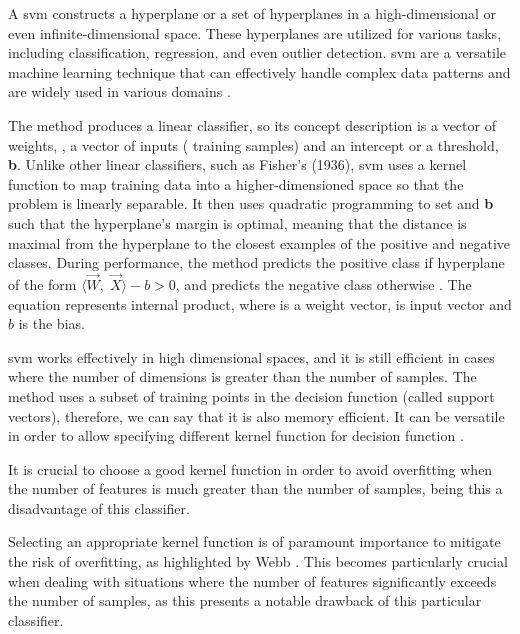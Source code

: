 A \gls{svm} constructs a hyperplane or a set of hyperplanes in a high-dimensional or even infinite-dimensional space. These hyperplanes are utilized for various tasks, including classification, regression, and even outlier detection. \gls{svm} are a versatile machine learning technique that can effectively handle complex data patterns and are widely used in various domains \cite{scikit_learn2023}.

The method produces a linear classifier, so its concept description is a vector of weights, , a vector of inputs ( training samples)  and an intercept or a threshold, \textbf{b}. Unlike other linear classifiers, such as Fisher’s (1936), \gls{svm} uses a kernel function \cite{scikit_learn2023} to map training data into a higher-dimensioned space so that the problem is linearly separable. It then uses quadratic programming to set  and \textbf{b} such that the hyperplane’s margin is optimal, meaning that the distance is maximal from the hyperplane to the closest examples of the positive and negative classes. During performance, the method predicts the positive class if hyperplane of the form  
$\langle \overrightarrow{W} , \; \overrightarrow{X} \rangle - b > 0$, and predicts the negative class otherwise \cite{J_Zico_Kolter2006}. The equation represents internal product, where  is a weight vector,  is input vector and $b$ is the bias.
 
\gls{svm} works effectively in high dimensional spaces, and it is still efficient in cases where the number of dimensions is greater than the number of samples. The method uses a subset of training points in the decision function (called support vectors), therefore, we can say that it is also memory efficient. It can be versatile in order to allow specifying different kernel function for decision function \cite{scikit_learn2023}.  

It is crucial to choose a good kernel function in order to avoid overfitting  when the number of features is much greater than the number of samples, being this a disadvantage of this classifier.

Selecting an appropriate kernel function is of paramount importance to mitigate the risk of overfitting, as highlighted by Webb \cite{OverfittingWebb}. This becomes particularly crucial when dealing with situations where the number of features significantly exceeds the number of samples, as this presents a notable drawback of this particular classifier.

